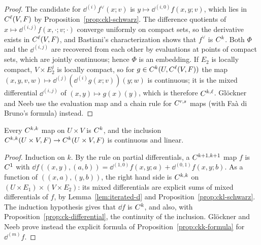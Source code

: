 \begin{proof}
  \leanok
  The candidate for $\dd^{(i)} f^\vee(x; v)$ is $y \mapsto \dd^{(i,0)} f(x, y; v)$, which lies in
  $C^{\ell}(V, F)$ by Proposition~\ref{prop:ckl-schwarz}. The difference quotients of
  $x \mapsto \dd^{(i,j)} f(x, \cdot; v; \cdot)$ converge uniformly on compact sets, so the
  derivative exists in $C^{\ell}(V, F)$, and Bastiani's characterization shows that $f^\vee$ is
  $C^{k}$. Both $\Phi$ and the $\dd^{(i,j)}$ are recovered from each other by evaluations at
  points of compact sets, which are jointly continuous; hence $\Phi$ is an embedding. If $E_2$
  is locally compact, $V \times E_2^j$ is locally compact, so for $g \in C^{k}(U, C^{\ell}(V, F))$
  the map $(x, y, v, w) \mapsto \dd^{(j)}(\dd^{(i)} g(x; v))(y; w)$ is continuous; it is the
  mixed differential $\dd^{(i,j)}$ of $(x, y) \mapsto g(x)(y)$, which is therefore $C^{k,\ell}$.
  Glöckner and Neeb use the evaluation map and a chain rule for $C^{r,s}$ maps (with Faà di
  Bruno's formula) instead.
\end{proof}

\begin{proposition}[{\cite[Prop.~1.7.33(b)]{GN26}}]
  \label{prop:ckk-ck}
  \leanok
  Every $C^{k,k}$ map on $U \times V$ is $C^{k}$, and the inclusion
  $C^{k,k}(U \times V, F) \to C^{k}(U \times V, F)$ is continuous and linear.
\end{proposition}

\begin{proof}
  \leanok
  Induction on $k$. By the rule on partial differentials, a $C^{k+1,k+1}$ map $f$ is $C^{1}$
  with $\dd f((x, y), (a, b)) = \dd^{(1,0)} f(x, y; a) + \dd^{(0,1)} f(x, y; b)$. As a function of
  $((x, a), (y, b))$, the right hand side is $C^{k,k}$ on $(U \times E_1) \times (V \times E_2)$:
  its mixed differentials are explicit sums of mixed differentials of $f$, by
  Lemma~\ref{lem:iterated-d} and Proposition~\ref{prop:ckl-schwarz}. The induction hypothesis
  gives that $\dd f$ is $C^{k}$, and also, with Proposition~\ref{prop:ck-differential}, the
  continuity of the inclusion. Glöckner and Neeb prove instead the explicit formula of
  Proposition~\ref{prop:ckk-formula} for $\dd^{(m)} f$.
\end{proof}

